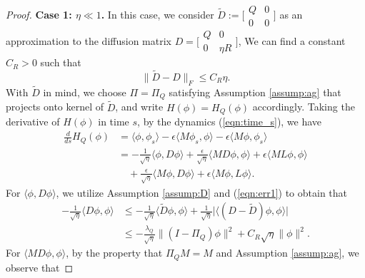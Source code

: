 \documentclass[10pt,a4paper]{amsart}
\begin{document}
\begin{proof}
\textbf{Case 1: $\eta\ll 1$.} In this case, we consider 
$\tilde D  := \bigl[\begin{smallmatrix}
            Q & 0\\
            0 & 0
        \end{smallmatrix}\bigr]$
as an approximation to the diffusion matrix $D= \bigl[\begin{smallmatrix}
            Q & 0\\
            0 & \eta R
        \end{smallmatrix}\bigr]$,
       We can find a constant $C_R>0$ such that
        \begin{equation}\label{eqn:err1}
            \|\tilde D- D\|_F\leq C_R \eta.
        \end{equation}
With $\tilde D$ in mind, we choose $\Pi = \Pi_Q$ satisfying Assumption \ref{assump:ag} that projects onto kernel of  $\tilde D$, and write $H(\phi) = H_Q(\phi)$ accordingly. Taking the derivative of $H(\phi)$ in time $s$, by the dynamics (\ref{eqn:time_s}), we have
\begin{equation}
    \begin{aligned}
        \frac{d}{ds} H_Q(\phi) &= \langle \phi, \phi_s\rangle-\epsilon\langle M\phi_s, \phi\rangle-\epsilon\langle M\phi, \phi_s\rangle\\
        &= -\frac{1}{\sqrt{\eta}}\langle \phi, D\phi\rangle + \frac{\epsilon}{\sqrt{\eta}}\langle MD\phi, \phi\rangle+\epsilon\langle M L\phi, \phi\rangle\\
        &\quad +\frac{\epsilon}{\sqrt{\eta}}\langle M\phi, D\phi\rangle+\epsilon\langle M\phi, L \phi\rangle.
    \end{aligned}
\end{equation}
For $\langle \phi, D\phi\rangle$, we utilize Assumption \ref{assump:D} and (\ref{eqn:err1}) to obtain that
\begin{equation}
\begin{aligned}
    -\frac{1}{\sqrt{\eta}}\langle   D \phi, \phi\rangle& \leq  -\frac{1}{\sqrt{\eta}}\langle  \tilde D \phi, \phi\rangle +\frac{1}{\sqrt{\eta}}\big|\langle (D - \tilde D)\phi, \phi\rangle \big|\\
    &\leq -\frac{\lambda_Q}{\sqrt{\eta}}\|(I-\Pi_Q)\phi\|^2+C_R \sqrt{\eta} \|\phi\|^2.
\end{aligned}
\end{equation}
For $\langle MD\phi, \phi\rangle$, by the property that $\Pi_Q M= M$ and Assumption \ref{assump:ag}, we observe that

\end{proof}
\end{document}
